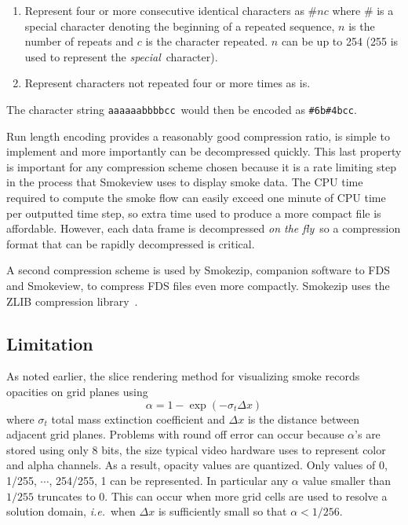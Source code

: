 \begin{enumerate}
\item Represent four or more consecutive identical characters as $\# n c$ where $\#$ is a special character denoting the beginning
of a repeated sequence, $n$ is the number of repeats and $c$ is the character repeated.  $n$ can be up to 254 (255 is used to
represent the {\em special}\ character). \item Represent characters not repeated four or more times as is.
\end{enumerate}

The character string {\tt aaaaaabbbbcc}\ would then be encoded as {\tt \#6b\#4bcc}.

Run length encoding provides a reasonably good compression ratio, is simple to implement and more importantly can be decompressed quickly. This last property is important for any compression scheme chosen because it is a rate limiting step in the process that Smokeview uses to display smoke data. The CPU time required to compute the smoke flow can easily exceed one minute of CPU time
per outputted time step, so extra time used to produce a more compact file is affordable. However, each data frame is decompressed {\em on the fly}\ so a compression format that can be rapidly decompressed is critical.

A second compression scheme is used by Smokezip, companion software to FDS and Smokeview, to compress FDS files even more compactly.  Smokezip uses the ZLIB compression library~\cite{ZLIB}.

\subsection{Limitation}
As noted earlier, the slice rendering method for visualizing smoke records opacities on grid planes using
\begin{equation}
\label{eq:alpha}
\alpha=1-\exp(-\sigma_t\Delta x)
\end{equation}
where $\sigma_t$ total mass extinction coefficient and $\Delta x$ is the distance between adjacent grid planes.  Problems with round off error can occur because $\alpha$'s are stored using only 8 bits, the size typical video hardware uses to represent color and alpha channels.
As a result, opacity values are quantized.  Only values of 0, 1/255, $\cdots$, 254/255, 1 can be represented.  In particular any $\alpha$ value smaller than $1/255$ truncates to 0.
This can occur when more grid cells are used to resolve a solution domain, {\em i.e.}\ when $\Delta x$ is sufficiently small so that $\alpha<1/256$.

